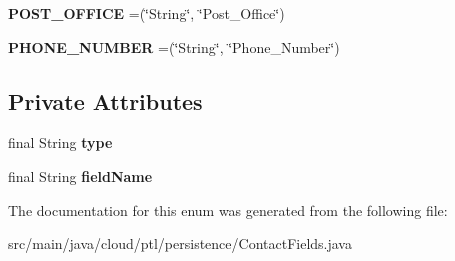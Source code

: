\begin{DoxyCompactItemize}
\item 
\mbox{\label{enumcloud_1_1ptl_1_1persistence_1_1ContactFields_ac8c9e2a31552b474755f035e3654e7f1}} 
{\bfseries P\+O\+S\+T\+\_\+\+O\+F\+F\+I\+CE} =(\char`\"{}String\char`\"{}, \char`\"{}Post\+\_\+\+Office\char`\"{})
\item 
\mbox{\label{enumcloud_1_1ptl_1_1persistence_1_1ContactFields_ae35985bb3fcd017c8812e4c2f2a28bd6}} 
{\bfseries P\+H\+O\+N\+E\+\_\+\+N\+U\+M\+B\+ER} =(\char`\"{}String\char`\"{}, \char`\"{}Phone\+\_\+\+Number\char`\"{})
\end{DoxyCompactItemize}
\subsection*{Private Attributes}
\begin{DoxyCompactItemize}
\item 
\mbox{\label{enumcloud_1_1ptl_1_1persistence_1_1ContactFields_af6f681a44a0c774b195a29a8b02eff20}} 
final String {\bfseries type}
\item 
\mbox{\label{enumcloud_1_1ptl_1_1persistence_1_1ContactFields_a275aff30051cb54b3cdda806632ff853}} 
final String {\bfseries field\+Name}
\end{DoxyCompactItemize}


The documentation for this enum was generated from the following file\+:\begin{DoxyCompactItemize}
\item 
src/main/java/cloud/ptl/persistence/Contact\+Fields.\+java\end{DoxyCompactItemize}

